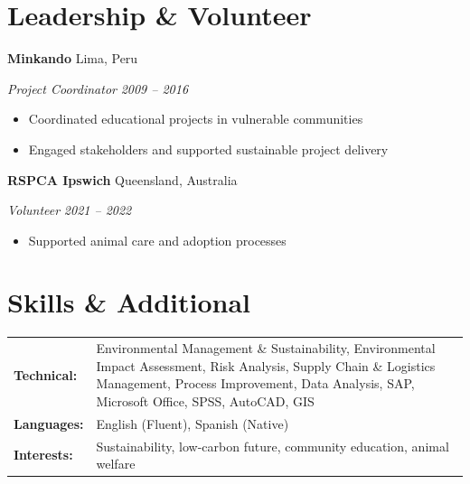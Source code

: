 \documentclass[11pt,letterpaper]{article}
\newcommand{\entry}[4]{%
  \noindent\textbf{#1} \hfill #2 \par\nopagebreak
  \textit{#3} \hfill \textit{#4} \par\nopagebreak
}
\begin{document}
\section{Leadership \& Volunteer}

\entry{Minkando}{Lima, Peru}{Project Coordinator}{2009 -- 2016}
\begin{itemize}
  \item Coordinated educational projects in vulnerable communities
  \item Engaged stakeholders and supported sustainable project delivery
\end{itemize}
\vspace{0.3em}

\entry{RSPCA Ipswich}{Queensland, Australia}{Volunteer}{2021 -- 2022}
\begin{itemize}
  \item Supported animal care and adoption processes
\end{itemize}
\vspace{0.3em}

\section{Skills \& Additional}

\begin{tabularx}{\textwidth}{@{}l X@{}}
\textbf{Technical:} & Environmental Management \& Sustainability, Environmental Impact Assessment, Risk Analysis, Supply Chain \& Logistics Management, Process Improvement, Data Analysis, SAP, Microsoft Office, SPSS, AutoCAD, GIS \\
\textbf{Languages:} & English (Fluent), Spanish (Native) \\
\textbf{Interests:} & Sustainability, low-carbon future, community education, animal welfare \\
\end{tabularx}
\end{document}
